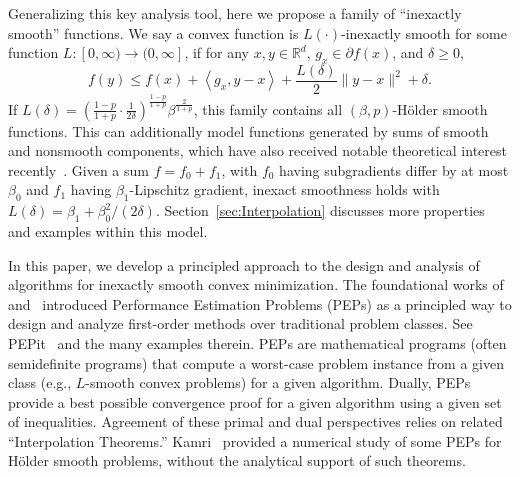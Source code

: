 \documentclass[11pt, hidelinks]{article}
\numberwithin{equation}{section}
\theoremstyle{thmstyletwo}%
\numberwithin{equation}{section}
\newcommand{\R}{\mathbb{R}}
\newcommand{\Holder}{H\"older }
\newcommand{\inner}[2]{\left\langle {#1}, {#2} \right\rangle}
\begin{document}
Generalizing this key analysis tool, here we propose a family of ``inexactly smooth'' functions. We say a convex function is $L(\cdot)$-inexactly smooth for some function $L\colon [0,\infty) \rightarrow (0, \infty]$, if for any $x, y \in \R^d$,  $g_x\in\partial f(x)$, and $\delta\geq 0$,
\begin{equation}\label{def: inexactly smooth}
    f(y) \leq f(x) + \inner{g_x}{y-x} + \frac{L(\delta)}{2}\|y-x\|^2 + \delta.
\end{equation}
If $L(\delta) = \left(\frac{1-p}{1+p}\cdot\frac{1}{2\delta}\right)^\frac{1-p}{1+p}\beta^{\frac{2}{1+p}}$, this family contains all $(\beta,p)$-\Holder smooth functions. This can additionally model functions generated by sums of smooth and nonsmooth components, which have also received notable theoretical interest recently~\cite{grimmer2023heterogeneous, wu2026universalparameterfreegradientsliding, guigues2025universalsubgradientproximalbundle, Jelena_fine_grained}. Given a sum $f=f_0+f_1$, with $f_0$ having subgradients differ by at most $\beta_0$ and $f_1$ having $\beta_1$-Lipschitz gradient, inexact smoothness holds with $L(\delta)=\beta_1+\beta_0^2/(2\delta)$. Section~\ref{sec:Interpolation} discusses more properties and examples within this model.



In this paper, we develop a principled approach to the design and analysis of algorithms for inexactly smooth convex minimization. The foundational works of~\cite{drori2014performance} and~\cite{taylor2017smooth,taylor2017composite} introduced Performance Estimation Problems (PEPs) as a principled way to design and analyze first-order methods over traditional problem classes. See PEPit~\cite{goujaud2024pepit} and the many examples therein. PEPs are mathematical programs (often semidefinite programs) that compute a worst-case problem instance from a given class (e.g., $L$-smooth convex problems) for a given algorithm. Dually, PEPs provide a best possible convergence proof for a given algorithm using a given set of inequalities. Agreement of these primal and dual perspectives relies on related ``Interpolation Theorems.'' 
Kamri~\cite[Chapter 4]{kamri2025} provided a numerical study of some PEPs for \Holder smooth problems, without the analytical support of such theorems.
\end{document}
